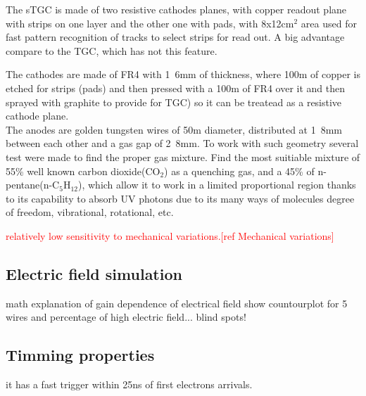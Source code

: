 The sTGC is made of two resistive cathodes planes, with copper readout plane with strips on one layer and the other one
with pads, with \unit{8x12}{cm$^2$} area used for fast pattern recognition of tracks to select strips for read out. A big
advantage compare to the TGC, which has not this feature.\par
The cathodes are made of FR4 with \unit{1.6}{mm} of thickness, where  \si{100}{\micro m} of copper is etched for strips (pads) and then
pressed with a \unit{100}{\micro m} of FR4 over it and then sprayed with graphite to provide  for
TGC) so it can be treatead as a resistive cathode plane.\\ The anodes are golden tungsten wires of \unit{50}{\micro m} diameter,
distributed at \unit{1.8}{mm} between each other and a gas gap of \unit{2.8}{mm}. To work with such geometry several test were made to find the proper gas
mixture\cite{gaschoice}. Find the most suitiable mixture of  55\% well known carbon dioxide(CO$_2$) as a quenching gas, and a
45\% of n-pentane(n-C$_5$H$_{12}$), which allow it to work in a limited proportional region thanks to its capability to absorb UV photons
due to its many ways of molecules degree of freedom, vibrational, rotational, etc.\par 
\textcolor{red}{relatively low sensitivity to mechanical variations.[ref Mechanical variations]}\par  




\subsection{Electric field simulation}


math explanation of gain dependence of electrical field
show countourplot for 5 wires and percentage of high electric field...
blind spots!

\subsection{Timming properties}
it has a fast trigger within 25ns of first electrons arrivals.

\subsection{}


